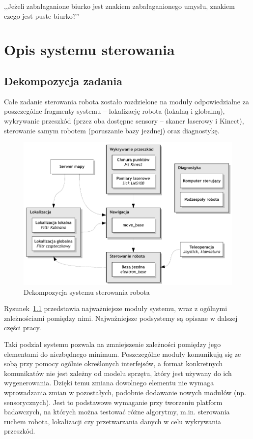 

\begin{savequote}[70mm]
,,Jeżeli zabałaganione biurko jest znakiem zabałaganionego umysłu, znakiem czego
jest puste biurko?''
\end{savequote}


\chapter{Opis systemu sterowania}
\label{chap:software}

\section{Dekompozycja zadania}

Całe zadanie sterowania robota zostało rozdzielone na moduły odpowiedzialne
za poszczególne fragmenty systemu -- lokalizację robota (lokalną i globalną),
wykrywanie przeszkód (przez oba dostępne sensory -- skaner laserowy i Kinect),
sterowanie samym robotem (poruszanie bazy jezdnej) oraz diagnostykę.

\begin{figure}[ht!]
\centering
\includegraphics{../img/decomposition}
\caption{Dekompozycja systemu sterowania robota}
\label{fig:decomposition}
\end{figure}

Rysunek~\ref{fig:decomposition} przedstawia najważniejsze moduły systemu,
wraz z ogólnymi zależnościami pomiędzy nimi. Najważniejsze podsystemy
są opisane w dalszej części pracy.

Taki podział systemu pozwala na zmniejszenie zależności pomiędzy jego elementami
do niezbędnego minimum. Poszczególne moduły komunikują się ze sobą przy pomocy
ogólnie określonych interfejsów, a format konkretnych komunikatów nie jest
zależny od modelu sprzętu, który jest używany do ich wygenerowania. Dzięki temu
zmiana dowolnego elementu nie wymaga wprowadzania zmian w pozostałych,
podobnie dodawanie nowych modułów (np. sensorycznych). Jest to podstawowe
wymaganie przy tworzeniu platform badawczych, na których można testować różne
algorytmy, m.in. sterowania ruchem robota, lokalizacji czy przetwarzania danych
w celu wykrywania przeszkód.


